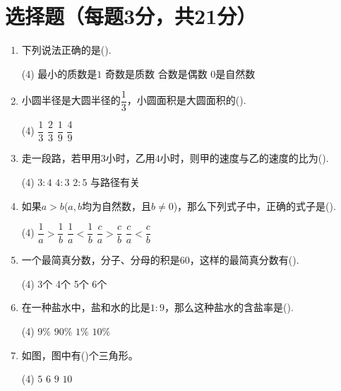 \documentclass[12pt,space]{ctexart} %
\begin{document}
\section{选择题（每题3分，共21分）}

\begin{enumerate}[itemsep=0.2em,topsep=0pt,resume]
	\item 下列说法正确的是(\qquad).
	      \begin{tasks}(4)
		      \task 最小的质数是$1$
		      \task 奇数是质数
		      \task 合数是偶数
		      \task $0$是自然数
	      \end{tasks}
	\item 小圆半径是大圆半径的$\dfrac{1}{3}$，小圆面积是大圆面积的(\qquad).
	      \begin{tasks}(4)
		      \task $\dfrac{1}{3}$
		      \task $\dfrac{2}{3}$
		      \task $\dfrac{1}{9}$
		      \task $\dfrac{4}{9}$
	      \end{tasks}
	\item 走一段路，若甲用$3$小时，乙用$4$小时，则甲的速度与乙的速度的比为(\qquad).
	      \begin{tasks}(4)
		      \task $3:4$
		      \task $4:3$
		      \task $2:5$
		      \task 与路径有关
	      \end{tasks}
	\item 如果$a>b$($a,b$均为自然数，且$b\ne 0$)，那么下列式子中，正确的式子是(\qquad).
	      \begin{tasks}(4)
		      \task $\dfrac{1}{a}>\dfrac{1}{b}$
		      \task $\dfrac{1}{a}<\dfrac{1}{b}$
		      \task $\dfrac{c}{a}>\dfrac{c}{b}$
		      \task $\dfrac{c}{a}<\dfrac{c}{b}$
	      \end{tasks}
	\item 一个最简真分数，分子、分母的积是$60$，这样的最简真分数有(\qquad).
	      \begin{tasks}(4)
		      \task 3个
		      \task 4个
		      \task 5个
		      \task 6个
	      \end{tasks}
	\item 在一种盐水中，盐和水的比是$1:9$，那么这种盐水的含盐率是(\qquad).
	      \begin{tasks}(4)
		      \task $9\%$
		      \task $90\%$
		      \task $1\%$
		      \task $10\%$
	      \end{tasks}
	\item 如图，图中有(\qquad)个三角形。
	      \begin{tasks}(4)
		      \task $5$
		      \task $6$
		      \task $9$
		      \task $10$
	      \end{tasks}

\end{enumerate}
\end{document}
